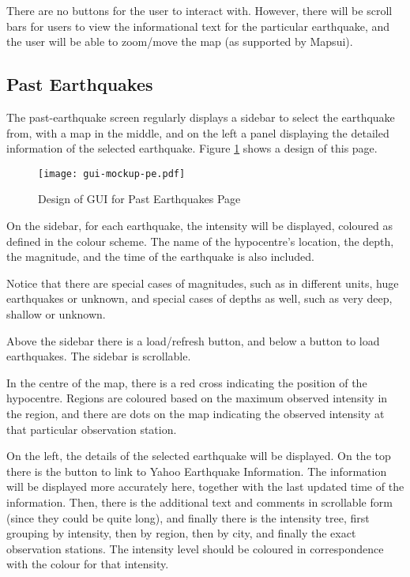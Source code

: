 There are no buttons for the user to interact with. However, there will be scroll bars for users to view the informational text for the particular earthquake, and the user will be able to zoom/move the map (as supported by Mapsui).

\subsection{Past Earthquakes}

The past-earthquake screen regularly displays a sidebar to select the earthquake from, with a map in the middle, and on the left a panel displaying the detailed information of the selected earthquake. Figure \ref{fig:gui-mockup-pe} shows a design of this page.

\begin{figure}[htp]
    \centering
    \texttt{[image: gui-mockup-pe.pdf]}
    \caption{Design of GUI for Past Earthquakes Page}
    \label{fig:gui-mockup-pe}
\end{figure}

On the sidebar, for each earthquake, the intensity will be displayed, coloured as defined in the colour scheme. The name of the hypocentre's location, the depth, the magnitude, and the time of the earthquake is also included.

Notice that there are special cases of magnitudes, such as in different units, huge earthquakes or unknown, and special cases of depths as well, such as very deep, shallow or unknown.

Above the sidebar there is a load/refresh button, and below a button to load earthquakes. The sidebar is scrollable.

In the centre of the map, there is a red cross indicating the position of the hypocentre. Regions are coloured based on the maximum observed intensity in the region, and there are dots on the map indicating the observed intensity at that particular observation station.

On the left, the details of the selected earthquake will be displayed. On the top there is the button to link to Yahoo Earthquake Information. The information will be displayed more accurately here, together with the last updated time of the information. Then, there is the additional text and comments in scrollable form (since they could be quite long), and finally there is the intensity tree, first grouping by intensity, then by region, then by city, and finally the exact observation stations. The intensity level should be coloured in correspondence with the colour for that intensity.

